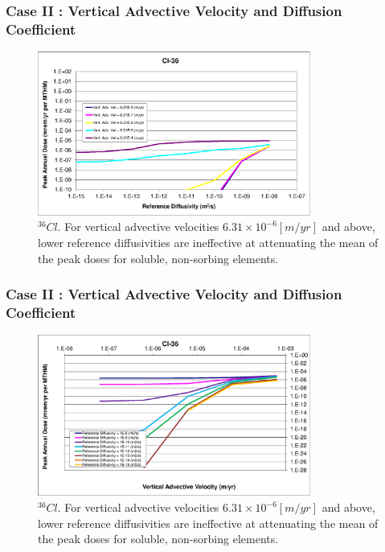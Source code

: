\begin{frame}[c]
  \frametitle{Case II : Vertical Advective Velocity and Diffusion Coefficient}

\begin{figure}[htp!]
\centering
\includegraphics[width=0.8\textwidth]{AdvVelAndDiffCoeffEBSFail/Cl-36.eps}
\caption{$^{36}Cl$.
For vertical advective velocities 
$6.31\times10^{-6}[m/yr]$ and above, lower reference diffusivities are 
ineffective at attenuating the mean of the peak doses for soluble, non-sorbing 
elements. 
}
\label{fig:VAdvVelCl36}
\end{figure}
\end{frame}


\begin{frame}[c]
  \frametitle{Case II : Vertical Advective Velocity and Diffusion Coefficient}
\begin{figure}[ht!]
\centering
\includegraphics[width=0.8\textwidth]{AdvVelAndDiffCoeffEBSFail/Cl-36-VAdvVel.eps}
\caption{$^{36}Cl$.
For vertical advective velocities 
$6.31\times10^{-6}[m/yr]$ and above, lower reference diffusivities are 
ineffective at attenuating the mean of the peak doses for soluble, non-sorbing 
elements. 
}
\label{fig:VAdvVelCl36VAdvVel}
\end{figure}
\end{frame}

